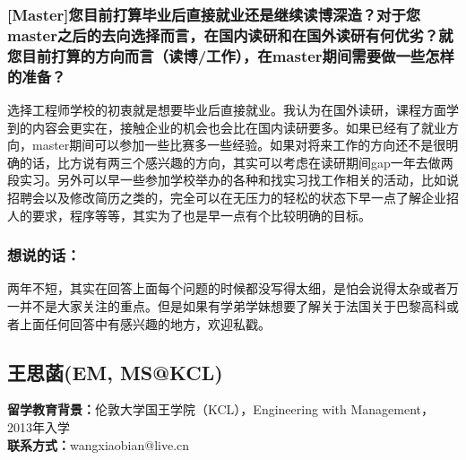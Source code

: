 \documentclass[a4paper,UTF8]{book}
\begin{document}
    \subsubsection*{[Master]您目前打算毕业后直接就业还是继续读博深造？对于您master之后的去向选择而言，在国内读研和在国外读研有何优劣？就您目前打算的方向而言（读博/工作），在master期间需要做一些怎样的准备？}
    选择工程师学校的初衷就是想要毕业后直接就业。我认为在国外读研，课程方面学到的内容会更实在，接触企业的机会也会比在国内读研要多。如果已经有了就业方向，master期间可以参加一些比赛多一些经验。如果对将来工作的方向还不是很明确的话，比方说有两三个感兴趣的方向，其实可以考虑在读研期间gap一年去做两段实习。另外可以早一些参加学校举办的各种和找实习找工作相关的活动，比如说招聘会以及修改简历之类的，完全可以在无压力的轻松的状态下早一点了解企业招人的要求，程序等等，其实为了也是早一点有个比较明确的目标。
        
    \subsubsection{想说的话：}
    两年不短，其实在回答上面每个问题的时候都没写得太细，是怕会说得太杂或者万一并不是大家关注的重点。但是如果有学弟学妹想要了解关于法国关于巴黎高科或者上面任何回答中有感兴趣的地方，欢迎私戳。


\clearpage
\subsection{王思菡(EM, MS@KCL)}
    \textbf{留学教育背景：}伦敦大学国王学院（KCL），Engineering with Management，2013年入学\\
    \textbf{联系方式：}wangxiaobian@live.cn
\end{document}
